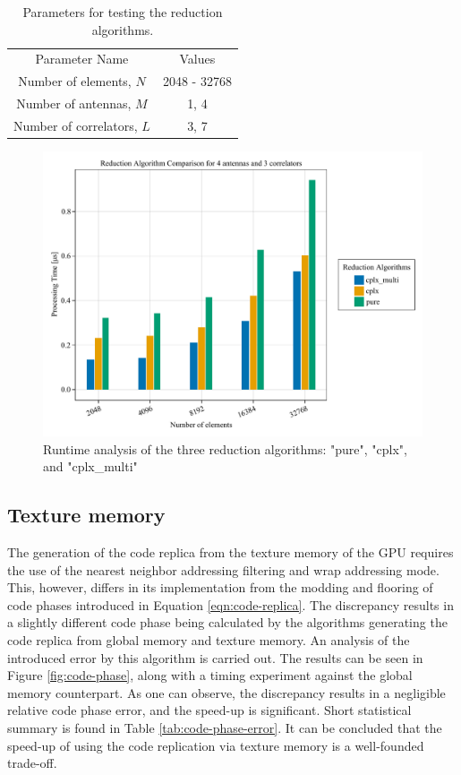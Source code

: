 \documentclass{juliacon}
\begin{document}
\begin{table}
  \centering
  \caption{\label{tab:reduction-params}Parameters for testing the reduction algorithms.}
  \begin{tabular}{cc}
  \multicolumn{1}{c}{Parameter Name} & \multicolumn{1}{c}{Values}  \vspace{2mm}\\ 
  Number of elements, $N$              & 2048 - 32768               \\
  Number of antennas, $M$               & 1, 4                       \\
  Number of correlators, $L$           & 3, 7                   
  \end{tabular}  
\end{table}
\begin{figure}[h]
  \centering
  \includegraphics[scale=0.6]{reduction.pdf}
  \caption{Runtime analysis of the three reduction algorithms: "pure", "cplx", and "cplx\_multi"}
  \label{fig:reduction-plot}
\end{figure}


\subsection*{Texture memory}

The generation of the code replica from the texture memory of the GPU requires the use of the nearest neighbor addressing filtering and wrap addressing mode. This, however, differs in its implementation from the modding and flooring of code phases introduced in Equation \ref{eqn:code-replica}. The discrepancy results in a slightly different code phase being calculated by the algorithms generating the code replica from global memory and texture memory. An analysis of the introduced error by this algorithm is carried out. The results can be seen in Figure \ref{fig:code-phase}, along with a timing experiment against the global memory counterpart. As one can observe, the discrepancy results in a negligible relative code phase error, and the speed-up is significant. Short statistical summary is found in Table \ref{tab:code-phase-error}. It can be  concluded that the speed-up of using the code replication via texture memory is a well-founded trade-off. 
\end{document}
